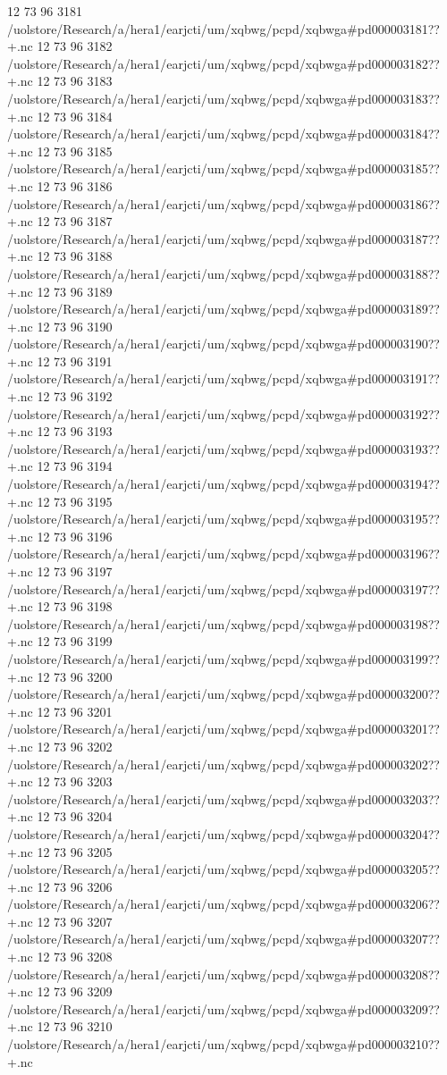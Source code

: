 12 73 96
3181
/uolstore/Research/a/hera1/earjcti/um/xqbwg/pcpd/xqbwga#pd000003181??+.nc
12 73 96
3182
/uolstore/Research/a/hera1/earjcti/um/xqbwg/pcpd/xqbwga#pd000003182??+.nc
12 73 96
3183
/uolstore/Research/a/hera1/earjcti/um/xqbwg/pcpd/xqbwga#pd000003183??+.nc
12 73 96
3184
/uolstore/Research/a/hera1/earjcti/um/xqbwg/pcpd/xqbwga#pd000003184??+.nc
12 73 96
3185
/uolstore/Research/a/hera1/earjcti/um/xqbwg/pcpd/xqbwga#pd000003185??+.nc
12 73 96
3186
/uolstore/Research/a/hera1/earjcti/um/xqbwg/pcpd/xqbwga#pd000003186??+.nc
12 73 96
3187
/uolstore/Research/a/hera1/earjcti/um/xqbwg/pcpd/xqbwga#pd000003187??+.nc
12 73 96
3188
/uolstore/Research/a/hera1/earjcti/um/xqbwg/pcpd/xqbwga#pd000003188??+.nc
12 73 96
3189
/uolstore/Research/a/hera1/earjcti/um/xqbwg/pcpd/xqbwga#pd000003189??+.nc
12 73 96
3190
/uolstore/Research/a/hera1/earjcti/um/xqbwg/pcpd/xqbwga#pd000003190??+.nc
12 73 96
3191
/uolstore/Research/a/hera1/earjcti/um/xqbwg/pcpd/xqbwga#pd000003191??+.nc
12 73 96
3192
/uolstore/Research/a/hera1/earjcti/um/xqbwg/pcpd/xqbwga#pd000003192??+.nc
12 73 96
3193
/uolstore/Research/a/hera1/earjcti/um/xqbwg/pcpd/xqbwga#pd000003193??+.nc
12 73 96
3194
/uolstore/Research/a/hera1/earjcti/um/xqbwg/pcpd/xqbwga#pd000003194??+.nc
12 73 96
3195
/uolstore/Research/a/hera1/earjcti/um/xqbwg/pcpd/xqbwga#pd000003195??+.nc
12 73 96
3196
/uolstore/Research/a/hera1/earjcti/um/xqbwg/pcpd/xqbwga#pd000003196??+.nc
12 73 96
3197
/uolstore/Research/a/hera1/earjcti/um/xqbwg/pcpd/xqbwga#pd000003197??+.nc
12 73 96
3198
/uolstore/Research/a/hera1/earjcti/um/xqbwg/pcpd/xqbwga#pd000003198??+.nc
12 73 96
3199
/uolstore/Research/a/hera1/earjcti/um/xqbwg/pcpd/xqbwga#pd000003199??+.nc
12 73 96
3200
/uolstore/Research/a/hera1/earjcti/um/xqbwg/pcpd/xqbwga#pd000003200??+.nc
12 73 96
3201
/uolstore/Research/a/hera1/earjcti/um/xqbwg/pcpd/xqbwga#pd000003201??+.nc
12 73 96
3202
/uolstore/Research/a/hera1/earjcti/um/xqbwg/pcpd/xqbwga#pd000003202??+.nc
12 73 96
3203
/uolstore/Research/a/hera1/earjcti/um/xqbwg/pcpd/xqbwga#pd000003203??+.nc
12 73 96
3204
/uolstore/Research/a/hera1/earjcti/um/xqbwg/pcpd/xqbwga#pd000003204??+.nc
12 73 96
3205
/uolstore/Research/a/hera1/earjcti/um/xqbwg/pcpd/xqbwga#pd000003205??+.nc
12 73 96
3206
/uolstore/Research/a/hera1/earjcti/um/xqbwg/pcpd/xqbwga#pd000003206??+.nc
12 73 96
3207
/uolstore/Research/a/hera1/earjcti/um/xqbwg/pcpd/xqbwga#pd000003207??+.nc
12 73 96
3208
/uolstore/Research/a/hera1/earjcti/um/xqbwg/pcpd/xqbwga#pd000003208??+.nc
12 73 96
3209
/uolstore/Research/a/hera1/earjcti/um/xqbwg/pcpd/xqbwga#pd000003209??+.nc
12 73 96
3210
/uolstore/Research/a/hera1/earjcti/um/xqbwg/pcpd/xqbwga#pd000003210??+.nc
